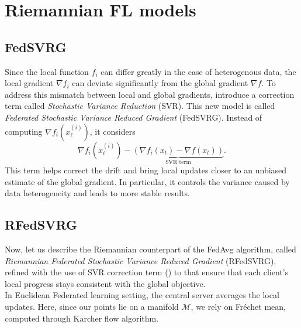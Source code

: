 \documentclass[10pt,a4paper]{book}
\theoremstyle{definition}
\theoremstyle{plain}
\theoremstyle{remark}
\newcommand \M {\mathcal{M}}
\begin{document}
\section{Riemannian FL models}
\subsection{FedSVRG} Since the local function $f_i$ can differ greatly in the case of heterogenous data, the local gradient $\nabla f_i$ can deviate significantly from the global gradient $\nabla f$. To address this mismatch between local and global gradients, \cite{konevcny2016federated}  introduce a correction term called \emph{Stochastic Variance Reduction} (SVR). This new model is called \emph{Federated Stochastic Variance Reduced Gradient} (FedSVRG).  Instead of computing $\nabla f_i(x_{\ell}^{(i)})$, it considers
$$\nabla f_i(x_{\ell}^{(i)})-\underbrace{\left(\nabla f_i(x_{t})-\nabla f(x_t)\right)}_{\text{SVR term}}.$$
This term helps correct the drift and bring local updates closer to an unbiased estimate of the global gradient. In particular, it controls the variance caused by data heterogeneity and leads to more stable results. 
\par \bigskip

\subsection{RFedSVRG} Now, let us describe the Riemannian counterpart of the FedAvg algorithm, called \emph{Riemannian Federated Stochastic Variance Reduced Gradient} (RFedSVRG), refined with the use of SVR correction term (\cite{li2022federated}) to that ensure that each client's local progress stays consistent with the global objective. \\
In Euclidean Federated learning setting, the central server averages the local updates. Here, since our points lie on a manifold $\M$, we rely on Fréchet mean, computed through Karcher flow algorithm.
\end{document}
